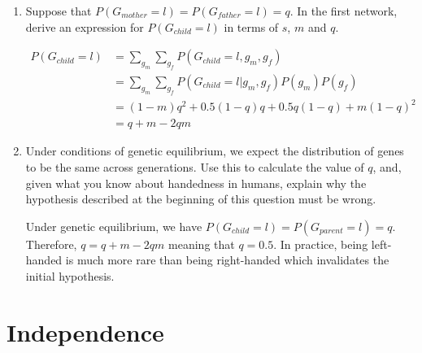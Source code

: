 \documentclass[11pt, a4paper]{article}
\begin{document}
\begin{enumerate}
    \item Suppose that $P(G_{mother} = l) = P(G_{father} = l) = q$. In the first network, derive an expression for $P(G_{child} = l)$ in terms of $s$, $m$ and $q$.
    \begin{solution}
        \begin{align*}
            P(G_{child} = l) & = \sum_{g_m} \sum_{g_f} P(G_{child} = l, g_m, g_f) \\
            & = \sum_{g_m} \sum_{g_f} P(G_{child} = l | g_m, g_f) P(g_m) P(g_f) \\
            & = (1 - m) q^2 + 0.5 (1 - q) q + 0.5 q (1 - q) + m (1 - q)^2 \\
            & = q + m - 2qm
        \end{align*}
    \end{solution}

    \item Under conditions of genetic equilibrium, we expect the distribution of genes to be the same across generations. Use this to calculate the value of $q$, and, given what you know about handedness in humans, explain why the hypothesis described at the beginning of this question must be wrong.

    \begin{solution}
        Under genetic equilibrium, we have $P(G_{child} = l) = P(G_{parent} = l) = q$. Therefore, $q = q + m - 2 q m$ meaning that $q = 0.5$. In practice, being left-handed is much more rare than being right-handed which invalidates the initial hypothesis.
    \end{solution}
\end{enumerate}

\newpage

\section{Independence}

\begin{figure}[h]
    \centering
\end{figure}
\end{document}
